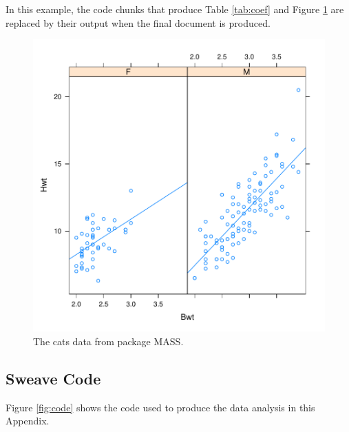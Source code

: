 \documentclass[11pt,article,oneside]{memoir}
\begin{document}
In this example, the code chunks that produce Table \ref{tab:coef} and Figure
\ref{fig:cats} are replaced by their output when the final document is produced. 

\begin{figure}[h!]
  \centering
{} 
\includegraphics{figures/apps-figure}

  \caption{\small The cats data from package MASS.}
  \label{fig:cats}
\end{figure}
\label{sec:append-sweave-exampl}

 
\subsection*{Sweave Code} %
\label{app:sweave_code}

\label{app:sweave-code}
Figure \ref{fig:code} shows the code used to produce the data analysis in this Appendix.
\end{document}
